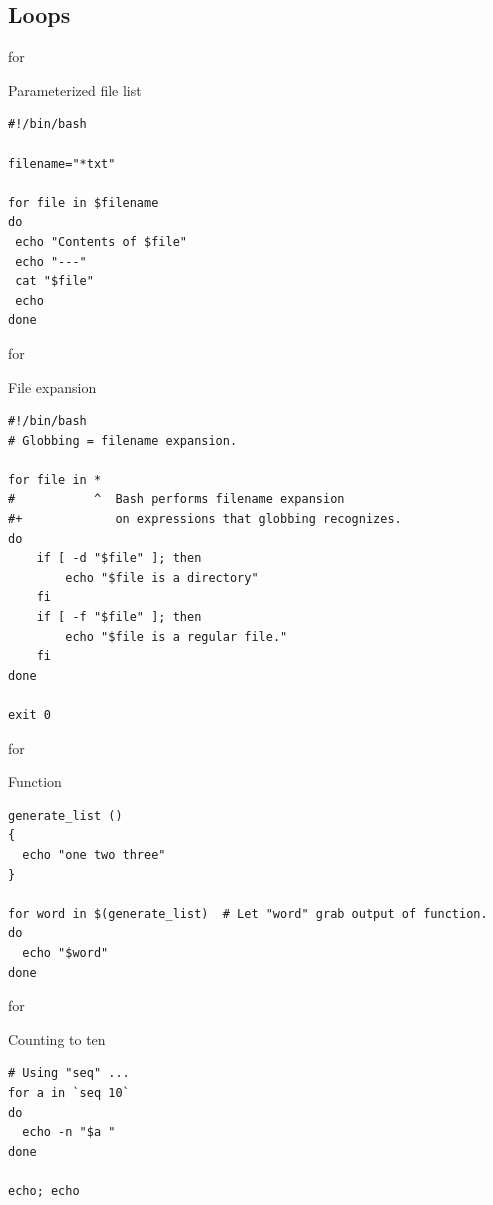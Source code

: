 \documentclass[xcolor=dvipsnames, 10pt, presentation,aspectratio=169]{beamer}
\begin{document}
\subsection{Loops}
\label{sec:org77be454}
\begin{frame}[label={sec:org9f1571e},fragile]{for}
 \begin{block}{Parameterized file list}
\begin{verbatim}
#!/bin/bash

filename="*txt"

for file in $filename
do
 echo "Contents of $file"
 echo "---"
 cat "$file"
 echo
done
\end{verbatim}
\end{block}
\end{frame}
\begin{frame}[label={sec:orgf818c64},fragile]{for}
 \begin{block}{File expansion}
\begin{verbatim}
#!/bin/bash
# Globbing = filename expansion.

for file in *
#           ^  Bash performs filename expansion
#+             on expressions that globbing recognizes.
do
    if [ -d "$file" ]; then
        echo "$file is a directory"
    fi
    if [ -f "$file" ]; then
        echo "$file is a regular file."
    fi
done

exit 0
\end{verbatim}
\end{block}
\end{frame}
\begin{frame}[label={sec:org1490080},fragile]{for}
 \begin{block}{Function}
\begin{verbatim}
generate_list ()
{
  echo "one two three"
}

for word in $(generate_list)  # Let "word" grab output of function.
do
  echo "$word"
done
\end{verbatim}
\end{block}
\end{frame}
\begin{frame}[label={sec:orge6e5fc3},fragile]{for}
 \begin{block}{Counting to ten}
\begin{verbatim}
# Using "seq" ...
for a in `seq 10`
do
  echo -n "$a "
done  

echo; echo
\end{verbatim}
\end{block}
\end{frame}
\end{document}
